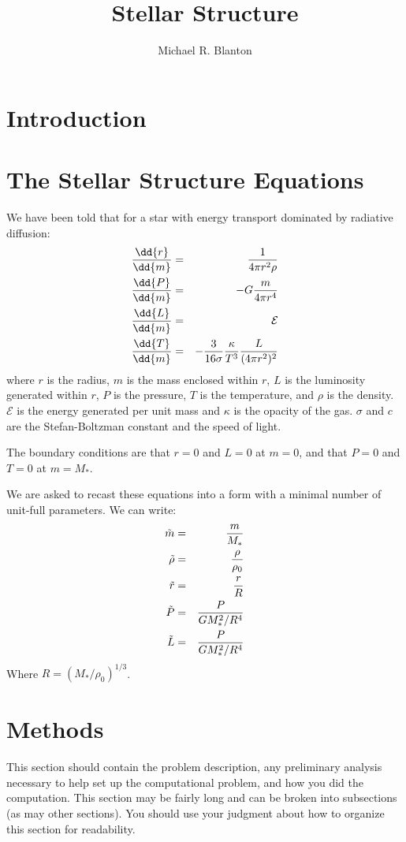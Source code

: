 \documentclass[11pt]{article}
\title{Stellar Structure}
\author{Michael R. Blanton}
\begin{document}
\maketitle


\section{Introduction}
\label{sec:intro}

\section{The Stellar Structure Equations}

We have been told that for a star with energy transport dominated by
radiative diffusion:
\begin{eqnarray}
\frac{\dd{r}}{\dd{m}} &=& \frac{1}{4\pi r^2 \rho} \cr
\frac{\dd{P}}{\dd{m}} &=& -G \frac{m}{4\pi r^4} \cr
\frac{\dd{L}}{\dd{m}} &=& \mathcal{E} \cr
\frac{\dd{T}}{\dd{m}} &=& - \frac{3}{16 \sigma } \frac{\kappa}{T^3}
\frac{L}{(4\pi r^2)^2}
\end{eqnarray}
where $r$ is the radius, $m$ is the mass enclosed within $r$, $L$ is
the luminosity generated within $r$, $P$ is the pressure, $T$ is the
temperature, and $\rho$ is the density. $\mathcal{E}$ is the energy
generated per unit mass and $\kappa$ is the opacity of the
gas. $\sigma$ and $c$ are the Stefan-Boltzman constant and the speed
of light.

The boundary conditions are that $r=0$ and $L=0$ at $m=0$, and that
$P=0$ and $T=0$ at $m=M_\ast$.

We are asked to recast these equations into a form with a minimal
number of unit-full parameters. We can write:
\begin{eqnarray}
\tilde{m} &=& \frac{m}{M_\ast} \cr
\tilde{\rho} &=& \frac{\rho}{\rho_0} \cr
\tilde{r} &=& \frac{r}{R} \cr
\tilde{P} &=& \frac{P}{GM_\ast^2 / R^4} \cr
\tilde{L} &=& \frac{P}{GM_\ast^2 / R^4} \cr
\end{eqnarray}
Where $R = (M_\ast / \rho_0)^{1/3}$. 

\section{Methods}
\label{sec:methods}

This section should contain the problem description, any preliminary
analysis necessary to help set up the computational problem, and how
you did the computation. This section may be fairly long and can be
broken into subsections (as may other sections). You should use your
judgment about how to organize this section for readability.
\end{document}
